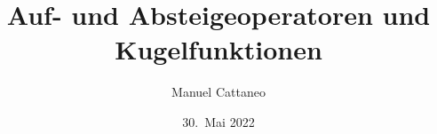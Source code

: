 %
%
%


\beamertemplatenavigationsymbolsempty
\title[Kugel]{Auf- und Absteigeoperatoren und Kugelfunktionen}
\author[M.~Cattaneo]{Manuel Cattaneo}
\date[]{30.~Mai 2022}

